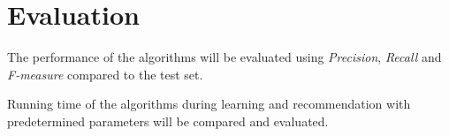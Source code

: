 
\section{Evaluation}\label{sec:method:eval}

The performance of the algorithms will be evaluated using \textit{Precision}, \textit{Recall} and \textit{F-measure} compared to the test set.  

Running time of the algorithms during learning and recommendation with predetermined parameters will be compared and evaluated.

